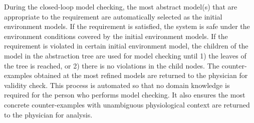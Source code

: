 During the closed-loop model checking, the most abstract model(s) that are appropriate to the requirement are automatically selected as the initial environment models. If the requirement is satisfied, the system is safe under the environment conditions covered by the initial environment models. If the requirement is violated in certain initial environment model, the children of the model in the abstraction tree are used for model checking until 1) the leaves of the tree is reached, or 2) there is no violations in the child nodes. The counter-examples obtained at the most refined models are returned to the physician for validity check. This process is automated so that no domain knowledge is required for the person who performs model checking. It also ensures the most concrete counter-examples with unambiguous physiological context are returned to the physician for analysis. 

